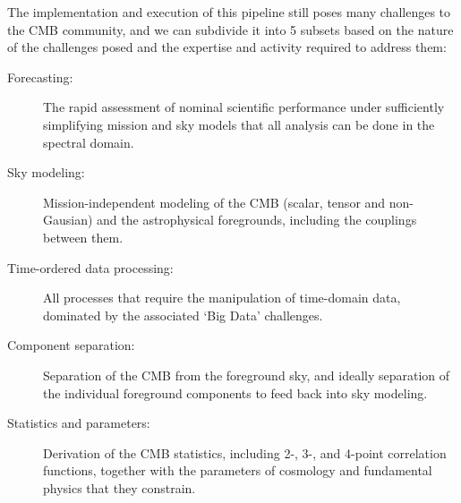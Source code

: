 The implementation and execution of this pipeline still poses many challenges to the CMB community, and we can subdivide it into 5 subsets based on the nature of the challenges posed and the expertise and activity required to address them:
\vspace*{-0.1in}
\begin{description}
\item[Forecasting:] The rapid assessment of nominal scientific performance under sufficiently simplifying mission and sky models that all analysis can be done in the spectral domain.
\item[Sky modeling:] Mission-independent modeling of the CMB (scalar, tensor and non-Gausian) and the astrophysical foregrounds, including the couplings between them.
\item[Time-ordered data processing:] All processes that require the manipulation of time-domain data, dominated by the associated `Big Data' challenges.
\item[Component separation:] Separation of the CMB from the foreground sky, and ideally separation of the individual foreground components to feed back into sky modeling.
\item[Statistics and parameters:] Derivation of the CMB statistics, including 2-, 3-, and 4-point correlation functions, together with the parameters of cosmology and fundamental physics that they constrain.
\end{description}

\newpage



\newpage



\newpage



\newpage



\newpage



\newpage

%



